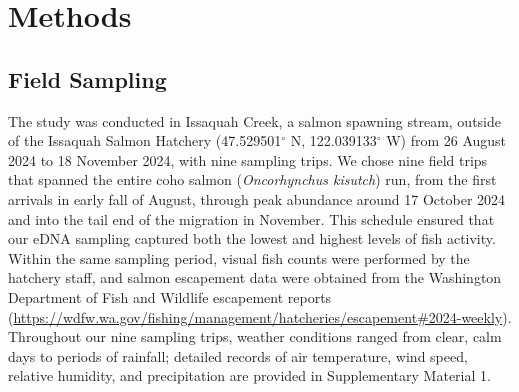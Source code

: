 \documentclass{article}
\begin{document}
\section{Methods}

\subsection{Field Sampling}

The study was conducted in Issaquah Creek, a salmon spawning stream, outside of the Issaquah Salmon Hatchery (47.529501$^\circ$ N, 122.039133$^\circ$ W) from 26 August 2024 to 18 November 2024, with nine sampling trips. We chose nine field trips that spanned the entire coho salmon (\textit{Oncorhynchus kisutch}) run, from the first arrivals in early fall of August, through peak abundance around 17 October 2024 and into the tail end of the migration in November. This schedule ensured that our eDNA sampling captured both the lowest and highest levels of fish activity. Within the same sampling period, visual fish counts were performed by the hatchery staff, and salmon escapement data were obtained from the Washington Department of Fish and Wildlife escapement reports (\href{https://wdfw.wa.gov/fishing/management/hatcheries/escapement#2024-weekly}{https://wdfw.wa.gov/fishing/management/hatcheries/escapement\#2024-weekly}). Throughout our nine sampling trips, weather conditions ranged from clear, calm days to periods of  rainfall; detailed records of air temperature, wind speed, relative humidity, and precipitation are provided in Supplementary Material 1.
\end{document}
